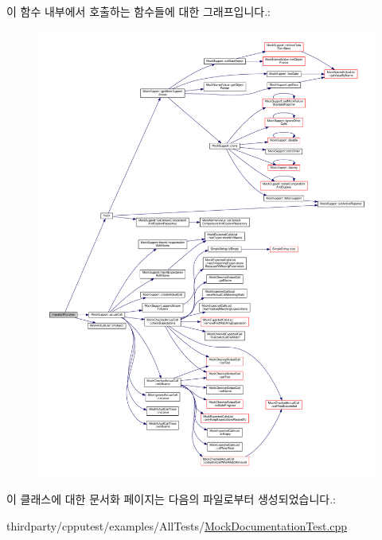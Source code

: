 이 함수 내부에서 호출하는 함수들에 대한 그래프입니다.\+:
\nopagebreak
\begin{figure}[H]
\begin{center}
\leavevmode
\includegraphics[width=350pt]{class_class_from_production_code_mock_a1c36efc83e945cac88c18e52da55e612_cgraph}
\end{center}
\end{figure}




이 클래스에 대한 문서화 페이지는 다음의 파일로부터 생성되었습니다.\+:\begin{DoxyCompactItemize}
\item 
thirdparty/cpputest/examples/\+All\+Tests/\hyperlink{_mock_documentation_test_8cpp}{Mock\+Documentation\+Test.\+cpp}\end{DoxyCompactItemize}
